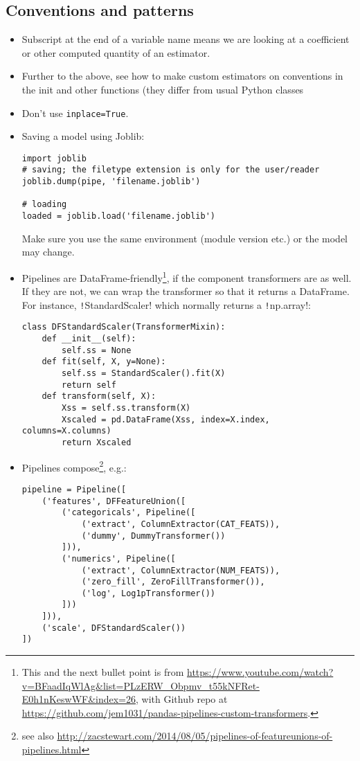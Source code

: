 \documentclass[11pt]{article}
\theoremstyle{definition}
\begin{document}
\subsection{Conventions and patterns}
\begin{itemize}
\item Subscript at the end of a variable name means we are looking at a coefficient or other computed quantity of an estimator.	
\item Further to the above, see how to make custom estimators on conventions in the init and other functions (they differ from usual Python classes
\item Don't use \texttt{inplace=True}.
\item Saving a model using Joblib:
\begin{verbatim}
import joblib
# saving; the filetype extension is only for the user/reader
joblib.dump(pipe, 'filename.joblib') 

# loading
loaded = joblib.load('filename.joblib')
\end{verbatim}
Make sure you use the same environment (module version etc.) or the model may change.
\item Pipelines are DataFrame-friendly\footnote{This and the next bullet point is from \url{https://www.youtube.com/watch?v=BFaadIqWlAg&list=PLzERW_Obpmv_t55kNFRet-E0h1nKeswWF&index=26}, with Github repo at \url{https://github.com/jem1031/pandas-pipelines-custom-transformers}.}, if the component transformers are as well. If they are not, we can wrap the transformer so that it returns a DataFrame. For instance, \texttt!StandardScaler! which normally returns a \texttt!np.array!:
\begin{verbatim}
class DFStandardScaler(TransformerMixin):
    def __init__(self):
        self.ss = None
    def fit(self, X, y=None):
        self.ss = StandardScaler().fit(X)
        return self    
    def transform(self, X):
        Xss = self.ss.transform(X)
        Xscaled = pd.DataFrame(Xss, index=X.index, columns=X.columns)
        return Xscaled
\end{verbatim}
\item Pipelines compose\footnote{see also \url{http://zacstewart.com/2014/08/05/pipelines-of-featureunions-of-pipelines.html}}, e.g.:
\begin{verbatim}
pipeline = Pipeline([
    ('features', DFFeatureUnion([
        ('categoricals', Pipeline([
            ('extract', ColumnExtractor(CAT_FEATS)),
            ('dummy', DummyTransformer())
        ])),
        ('numerics', Pipeline([
            ('extract', ColumnExtractor(NUM_FEATS)),
            ('zero_fill', ZeroFillTransformer()),
            ('log', Log1pTransformer())
        ]))
    ])),
    ('scale', DFStandardScaler())
])    
\end{verbatim}

\end{itemize}
\end{document}
